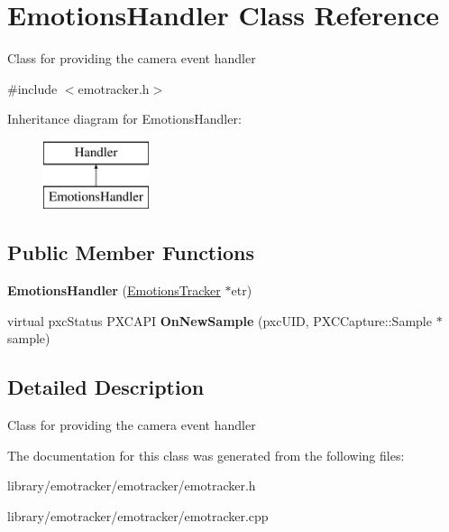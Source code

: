 \hypertarget{class_emotions_handler}{}\section{Emotions\+Handler Class Reference}
\label{class_emotions_handler}


Class for providing the camera event handler  




{\ttfamily \#include $<$emotracker.\+h$>$}

Inheritance diagram for Emotions\+Handler\+:\begin{figure}[H]
\begin{center}
\leavevmode
\includegraphics[height=2.000000cm]{class_emotions_handler}
\end{center}
\end{figure}
\subsection*{Public Member Functions}
\begin{DoxyCompactItemize}
\item 
\mbox{\label{class_emotions_handler_a170b451fad0b9b50f644181de23f91f3}} 
{\bfseries Emotions\+Handler} (\hyperlink{class_emotions_tracker}{Emotions\+Tracker} $\ast$etr)
\item 
\mbox{\label{class_emotions_handler_afa6e3c01919c831d6b76e4848aef9742}} 
virtual pxc\+Status P\+X\+C\+A\+PI {\bfseries On\+New\+Sample} (pxc\+U\+ID, P\+X\+C\+Capture\+::\+Sample $\ast$sample)
\end{DoxyCompactItemize}


\subsection{Detailed Description}
Class for providing the camera event handler 

The documentation for this class was generated from the following files\+:\begin{DoxyCompactItemize}
\item 
library/emotracker/emotracker/emotracker.\+h\item 
library/emotracker/emotracker/emotracker.\+cpp\end{DoxyCompactItemize}
